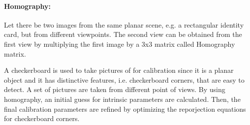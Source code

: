 \documentclass[11pt]{article}
\begin{document}
    \paragraph{Homography:} Let there be two images from the same planar scene, e.g. a rectangular identity card, but from
    different viewpoints. The second view can be obtained from the first view by multiplying the first image by
    a 3x3 matrix called Homography matrix.

    A checkerboard is used to take pictures of for calibration since it is a planar object and it has distinctive features,
    i.e. checkerboard corners, that are easy to detect. A set of pictures are taken from different point of views.
    By using homography, an initial guess for intrinsic parameters are calculated. Then, the final calibration
    parameters are refined by optimizing the reporjection equations for checkerboard corners.
\end{document}
